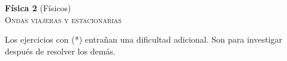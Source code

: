 \documentclass[11pt,spanish,a4paper]{article}
\begin{document}
\begin{center}
\textbf{Física 2} (Físicos) \hfill {}\\
	\textsc{\LARGE Ondas viajeras y estacionarias}
\end{center}


Los ejercicios con (*) entrañan una dificultad adicional. Son para investigar después de resolver los demás.



\begin{enumerate}







\end{enumerate}
\end{document}
